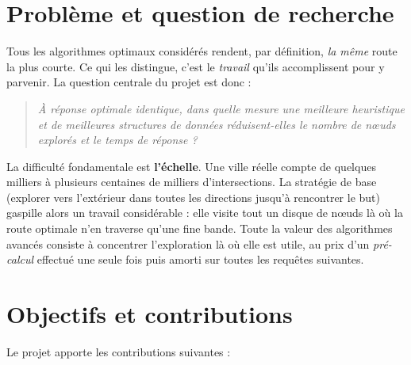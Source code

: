 \section{Problème et question de recherche}
\label{sec:question}

Tous les algorithmes optimaux considérés rendent, par définition, \emph{la même}
route la plus courte. Ce qui les distingue, c'est le \emph{travail} qu'ils
accomplissent pour y parvenir. La question centrale du projet est donc :

\begin{quote}
\itshape
À réponse optimale identique, dans quelle mesure une meilleure heuristique et de
meilleures structures de données réduisent-elles le nombre de nœuds explorés et
le temps de réponse ?
\end{quote}

La difficulté fondamentale est \textbf{l'échelle}. Une ville réelle compte de
quelques milliers à plusieurs centaines de milliers d'intersections. La stratégie
de base (explorer vers l'extérieur dans toutes les directions jusqu'à
rencontrer le but) gaspille alors un travail considérable : elle visite tout un
disque de nœuds là où la route optimale n'en traverse qu'une fine bande. Toute la
valeur des algorithmes avancés consiste à concentrer l'exploration là où elle est
utile, au prix d'un \emph{pré-calcul} effectué une seule fois puis amorti sur
toutes les requêtes suivantes.

\section{Objectifs et contributions}

Le projet apporte les contributions suivantes :

